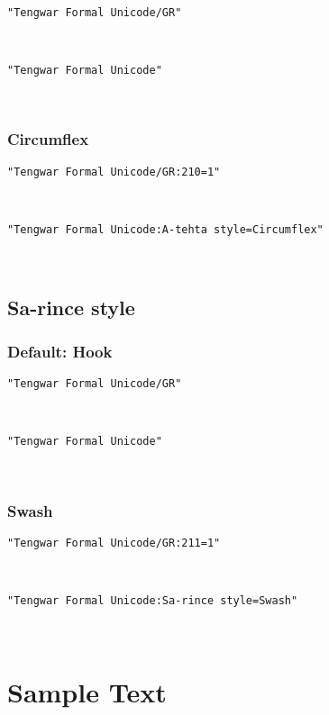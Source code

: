 \documentclass[11pt,a4paper]{article}
\begin{document}
\texttt{"Tengwar Formal Unicode/GR"}

\formalGR 

\noindent \texttt{"Tengwar Formal Unicode"}

\formalAAT 

\subsubsection{Circumflex}

\texttt{"Tengwar Formal Unicode/GR:210=1"}

\formalGRcircumflex 

\noindent \texttt{"Tengwar Formal Unicode:A-tehta style=Circumflex"}

\formalAATcircumflex 


\subsection{Sa-rince style}

\subsubsection{Default: Hook}

\texttt{"Tengwar Formal Unicode/GR"}

\formalGR 

\noindent \texttt{"Tengwar Formal Unicode"}

\formalAAT 

\subsubsection{Swash}

\texttt{"Tengwar Formal Unicode/GR:211=1"}

\formalGRswash 

\noindent \texttt{"Tengwar Formal Unicode:Sa-rince style=Swash"}

\formalAATswash 


\newpage

\section{Sample Text}
\end{document}
